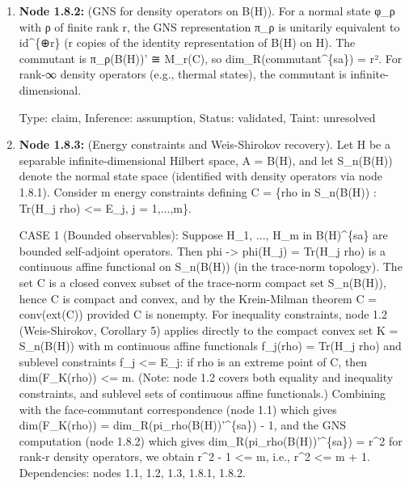\documentclass{article}
\begin{document}
\begin{enumerate}
\begin{enumerate}
For applications to bounded observables a\_1, ..., a\_m in B(H)\textasciicircum{}\{sa\}, the main theorem (node 1.3) applies directly. For unbounded Hamiltonians H\_j (self-adjoint operators affiliated with B(H)), the constraints rho -> Tr(H\_j rho) are generalized affine maps in the sense of Weis-Shirokov, and one must invoke node 1.2 in its generalized form; see node 1.8.3 for details.

  Type: claim, Inference: assumption, Status: pending, Taint: unresolved

\item \textbf{Node 1.8.2:} (GNS for density operators on B(H)). For a normal state φ\_ρ with ρ of finite rank r, the GNS representation π\_ρ is unitarily equivalent to id\textasciicircum{}\{⊕r\} (r copies of the identity representation of B(H) on H). The commutant is π\_ρ(B(H))' ≅ M\_r(C), so dim\_R(commutant\textasciicircum{}\{sa\}) = r². For rank-∞ density operators (e.g., thermal states), the commutant is infinite-dimensional.

  Type: claim, Inference: assumption, Status: validated, Taint: unresolved

\item \textbf{Node 1.8.3:} (Energy constraints and Weis-Shirokov recovery). Let H be a separable infinite-dimensional Hilbert space, A = B(H), and let S\_n(B(H)) denote the normal state space (identified with density operators via node 1.8.1). Consider m energy constraints defining C = \{rho in S\_n(B(H)) : Tr(H\_j rho) <= E\_j, j = 1,...,m\}.

CASE 1 (Bounded observables): Suppose H\_1, ..., H\_m in B(H)\textasciicircum{}\{sa\} are bounded self-adjoint operators. Then phi -> phi(H\_j) = Tr(H\_j rho) is a continuous affine functional on S\_n(B(H)) (in the trace-norm topology). The set C is a closed convex subset of the trace-norm compact set S\_n(B(H)), hence C is compact and convex, and by the Krein-Milman theorem C = conv(ext(C)) provided C is nonempty. For inequality constraints, node 1.2 (Weis-Shirokov, Corollary 5) applies directly to the compact convex set K = S\_n(B(H)) with m continuous affine functionals f\_j(rho) = Tr(H\_j rho) and sublevel constraints f\_j <= E\_j: if rho is an extreme point of C, then dim(F\_K(rho)) <= m. (Note: node 1.2 covers both equality and inequality constraints, and sublevel sets of continuous affine functionals.) Combining with the face-commutant correspondence (node 1.1) which gives dim(F\_K(rho)) = dim\_R(pi\_rho(B(H))'\textasciicircum{}\{sa\}) - 1, and the GNS computation (node 1.8.2) which gives dim\_R(pi\_rho(B(H))'\textasciicircum{}\{sa\}) = r\textasciicircum{}2 for rank-r density operators, we obtain r\textasciicircum{}2 - 1 <= m, i.e., r\textasciicircum{}2 <= m + 1. Dependencies: nodes 1.1, 1.2, 1.3, 1.8.1, 1.8.2.


\end{enumerate}
\end{enumerate}
\end{document}
